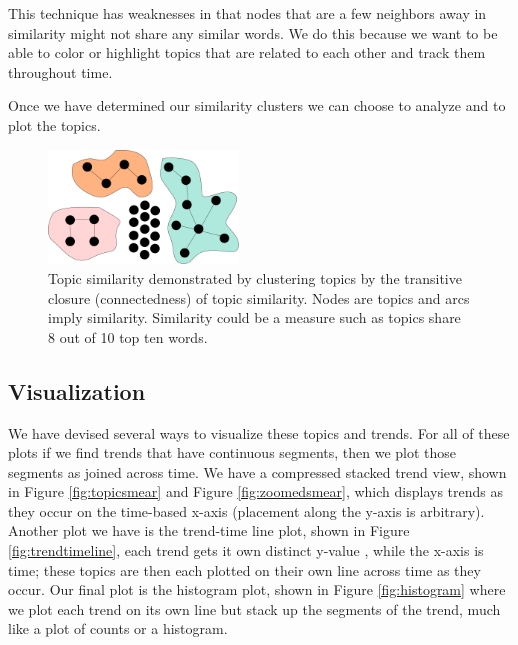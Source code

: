 \documentclass[times, 10pt,twocolumn]{article}
\begin{document}
This technique has weaknesses in that nodes that are  a few neighbors away in
similarity might not share any similar words.  We do this because we
want to be able to color or highlight topics that are related to each
other and track them throughout time.

Once we have determined our similarity clusters we can choose to
analyze and to plot the topics.

\begin{figure}
  \centering
  \includegraphics[width=0.45\textwidth]{transitiveclosure}
  \caption{Topic similarity demonstrated by clustering topics by the transitive closure (connectedness)
    of topic similarity. Nodes are topics and
    arcs imply similarity. Similarity could be a measure such as
    topics share 8 out of 10 top ten words.}
\label{fig:closure}
\end{figure}



\subsection{Visualization}

We have devised several ways to visualize these topics and
trends.  For all of these plots if we find trends that have continuous
segments, then we plot those segments as joined across time.  We have a
compressed stacked trend view, shown in Figure \ref{fig:topicsmear}
and Figure \ref{fig:zoomedsmear}, 
which displays trends as they occur
on the time-based x-axis (placement along the y-axis is arbitrary).
 Another plot we have is the trend-time line plot, shown in
Figure \ref{fig:trendtimeline}, each trend gets it own distinct y-value ,
while the x-axis is time; these topics are then each plotted on their
own line across time as they occur. Our final plot is the histogram
plot, shown in Figure \ref{fig:histogram} where we plot each trend on
its own line but stack up the segments of the trend, much like a plot
of counts or a histogram.
\end{document}
